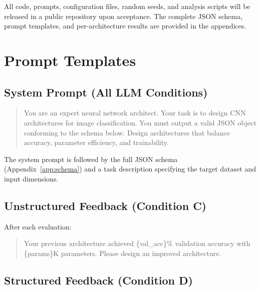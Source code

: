 \documentclass[10pt]{article}
\begin{document}
All code, prompts, configuration files, random seeds, and analysis scripts will
be released in a public repository upon acceptance.  The complete JSON schema,
prompt templates, and per-architecture results are provided in the appendices.



\newpage
\appendix

\section{Prompt Templates}
\label{app:prompts}

\subsection{System Prompt (All LLM Conditions)}

\begin{quote}\small\ttfamily
You are an expert neural network architect. Your task is to design CNN
architectures for image classification. You must output a valid JSON object
conforming to the schema below. Design architectures that balance accuracy,
parameter efficiency, and trainability.
\end{quote}

The system prompt is followed by the full JSON schema (Appendix~\ref{app:schema})
and a task description specifying the target dataset and input dimensions.

\subsection{Unstructured Feedback (Condition C)}

After each evaluation:

\begin{quote}\small\ttfamily
Your previous architecture achieved \{val\_acc\}\% validation accuracy
with \{params\}K parameters. Please design an improved architecture.
\end{quote}

\subsection{Structured Feedback (Condition D)}
\end{document}
